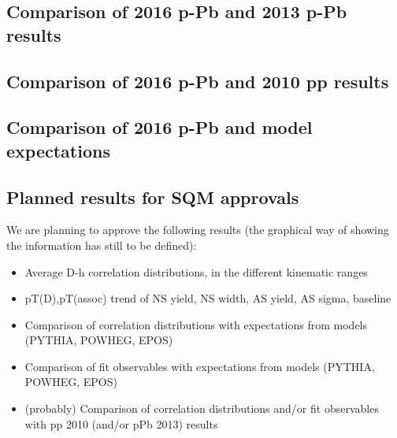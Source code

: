 \subsection{Comparison of 2016 p-Pb and 2013 p-Pb results}


\subsection{Comparison of 2016 p-Pb and 2010 pp results}


\subsection{Comparison of 2016 p-Pb and model expectations}


\subsection{Planned results for SQM approvals}
We are planning to approve the following results (the graphical way of showing the information has still to be defined):
\begin{itemize}
\item Average D-h correlation distributions, in the different kinematic ranges
\item pT(D),pT(assoc) trend of NS yield, NS width, AS yield, AS sigma, baseline
\item Comparison of correlation distributions with expectations from models (PYTHIA, POWHEG, EPOS)
\item Comparison of fit observables with expectations from models (PYTHIA, POWHEG, EPOS)
\item (probably) Comparison of correlation distributions and/or fit observables with pp 2010 (and/or pPb 2013) results
\end{itemize}

\clearpage 
